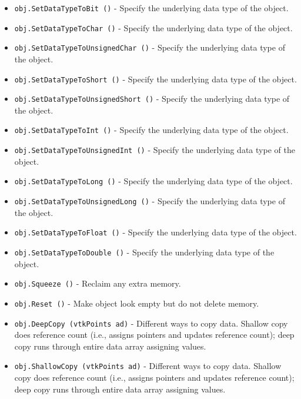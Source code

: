 \begin{itemize}
\item  \verb|obj.SetDataTypeToBit ()| -  Specify the underlying data type of the object.

\item  \verb|obj.SetDataTypeToChar ()| -  Specify the underlying data type of the object.

\item  \verb|obj.SetDataTypeToUnsignedChar ()| -  Specify the underlying data type of the object.

\item  \verb|obj.SetDataTypeToShort ()| -  Specify the underlying data type of the object.

\item  \verb|obj.SetDataTypeToUnsignedShort ()| -  Specify the underlying data type of the object.

\item  \verb|obj.SetDataTypeToInt ()| -  Specify the underlying data type of the object.

\item  \verb|obj.SetDataTypeToUnsignedInt ()| -  Specify the underlying data type of the object.

\item  \verb|obj.SetDataTypeToLong ()| -  Specify the underlying data type of the object.

\item  \verb|obj.SetDataTypeToUnsignedLong ()| -  Specify the underlying data type of the object.

\item  \verb|obj.SetDataTypeToFloat ()| -  Specify the underlying data type of the object.

\item  \verb|obj.SetDataTypeToDouble ()| -  Specify the underlying data type of the object.

\item  \verb|obj.Squeeze ()| -  Reclaim any extra memory.

\item  \verb|obj.Reset ()| -  Make object look empty but do not delete memory.  

\item  \verb|obj.DeepCopy (vtkPoints ad)| -  Different ways to copy data. Shallow copy does reference count (i.e.,
 assigns pointers and updates reference count); deep copy runs through
 entire data array assigning values.

\item  \verb|obj.ShallowCopy (vtkPoints ad)| -  Different ways to copy data. Shallow copy does reference count (i.e.,
 assigns pointers and updates reference count); deep copy runs through
 entire data array assigning values.


\end{itemize}
